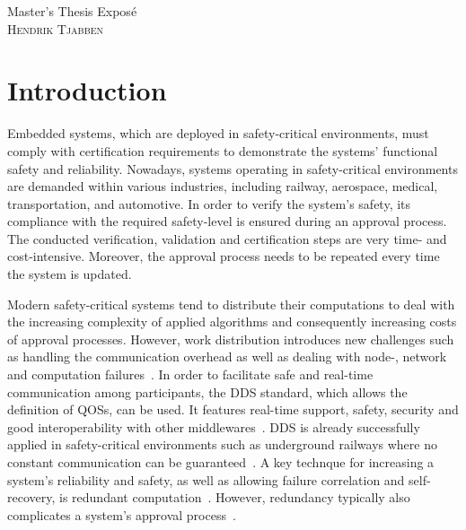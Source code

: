 \documentclass[a4paper, 12pt]{scrartcl}
\begin{document}
\begin{center}
  \Huge{Master's Thesis Expos\'{e}}\\
  \large{\textsc{Hendrik Tjabben}}
\end{center}


\section*{Introduction}
Embedded systems, which are deployed in safety-critical environments, must comply with certification requirements to demonstrate the systems' functional safety and reliability.
Nowadays, systems operating in safety-critical environments are demanded within various industries, including railway, aerospace, medical, transportation, and automotive.
In order to verify the system's safety, its compliance with the required safety-level is ensured during an approval process.
The conducted verification, validation and certification steps are very time- and cost-intensive.
Moreover, the approval process needs to be repeated every time the system is updated.

Modern safety-critical systems tend to distribute their computations to deal with the increasing complexity of applied algorithms and consequently increasing costs of approval processes.
However, work distribution introduces new challenges such as handling the communication overhead as well as dealing with node-, network and computation failures~\cite{DistributedSafety2020}.
In order to facilitate safe and real-time communication among participants, the \ac{DDS} standard, which allows the definition of \acp{QOS}, can be used.
It features real-time support, safety, security and good interoperability with other middlewares~\cite{DistributedSafety2020}.
\ac{DDS} is already successfully applied in safety-critical environments such as underground railways where no constant communication can be guaranteed~\cite{DDSInURail}.
A key technque for increasing a system's reliability and safety, as well as allowing failure correlation and self-recovery, is redundant computation~\cite{TanenbaumSteen07}.
However, redundancy typically also complicates a system's approval process~\cite{ReliabilityThroughRedundancy}.

\end{document}
